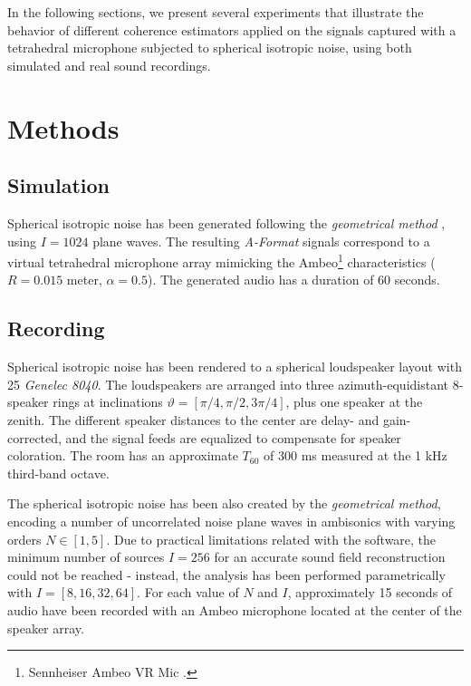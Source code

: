 In the following sections, we present several experiments that illustrate the behavior of different coherence estimators applied on the signals captured with a tetrahedral microphone subjected to spherical isotropic noise, using both simulated and real sound recordings.





\section{Methods}

\subsection{Simulation}
Spherical isotropic noise has been generated following the \textit{geometrical method} \cite{habets_generating_2007, habets_comments_2010}, using $I = 1024$ plane waves. The resulting \textit{A-Format} signals correspond to a virtual tetrahedral microphone array mimicking the Ambeo\footnote{Sennheiser Ambeo VR Mic \cite{sennheiser}.}
characteristics ($R=0.015$ meter, $\alpha=0.5$). 
The generated audio has a duration of 60 seconds. 





\subsection{Recording}

Spherical isotropic noise has been rendered to a spherical loudspeaker layout with 25 \textit{Genelec 8040}. The loudspeakers are arranged into three azimuth-equidistant 8-speaker rings at inclinations $\vartheta = [\pi/4, \pi/2, 3\pi/4]$, plus one speaker at the zenith.
The different speaker distances to the center are delay- and gain-corrected, and the signal feeds are equalized to compensate for speaker coloration. The room has an approximate $T_{60}$ of 300 ms measured at the 1 kHz third-band octave. 

The spherical isotropic noise has been also created by the \textit{geometrical method}, encoding a number of uncorrelated noise plane waves in ambisonics with varying orders $N \in [1,5]$. Due to practical limitations related with the software, the minimum number of sources $I = 256$ for an accurate sound field reconstruction \cite{habets_comments_2010} could not be reached - instead, the analysis has been performed parametrically with $I = [8, 16, 32, 64]$.
For each value of $N$ and $I$, approximately 15 seconds of audio have been recorded with an Ambeo microphone located at the center of the speaker array.

